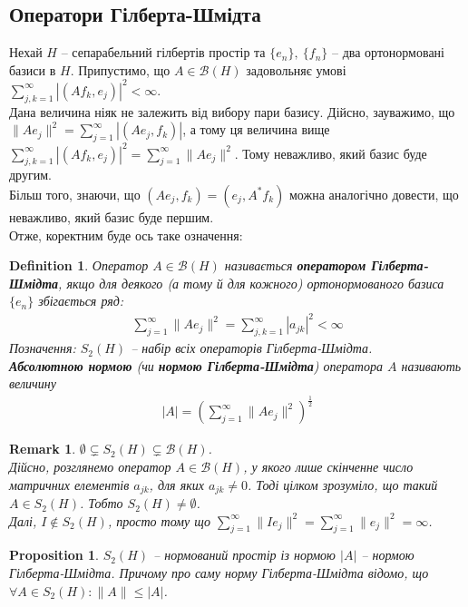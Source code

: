 \documentclass[a4paper, 10pt]{article}
\theoremstyle{theoremdd}
\theoremstyle{theoremdd}
\newtheorem{definition}[theorem]{Definition}
\theoremstyle{theoremdd}
\theoremstyle{theoremdd}
\theoremstyle{theoremdd}
\newtheorem{proposition}[theorem]{Proposition}
\theoremstyle{theoremdd}
\newtheorem{remark}[theorem]{Remark}
\theoremstyle{theoremdd}
\theoremstyle{theoremdd}
\begin{document}
\subsection{Оператори Гілберта-Шмідта}
Нехай $H$ -- сепарабельний гілбертів простір та $\{e_n\},\ \{f_n\}$ -- два ортонормовані базиси в $H$. Припустимо, що $A \in \mathcal{B}(H)$ задовольняє умові $\displaystyle\sum_{j,k=1}^\infty |(Af_k,e_j)|^2 < \infty$.\\
Дана величина ніяк не залежить від вибору пари базису. Дійсно, зауважимо, що $\|Ae_j\|^2 = \displaystyle\sum_{j=1}^\infty |(Ae_j,f_k)|$, а тому ця величина вище $\displaystyle\sum_{j,k=1}^\infty |(Af_k,e_j)|^2 = \sum_{j=1}^\infty \|Ae_j\|^2$. Тому неважливо, який базис буде другим.\\
Більш того, знаючи, що $(Ae_j,f_k) = (e_j,A^*f_k)$ можна аналогічно довести, що неважливо, який базис буде першим.\\
Отже, коректним буде ось таке означення:

\begin{definition}
Оператор $A \in \mathcal{B}(H)$ називається \textbf{оператором Гілберта-Шмідта}, якщо для деякого (а тому й для кожного) ортонормованого базиса $\{e_n\}$ збігається ряд:
\begin{align*}
\displaystyle\sum_{j=1}^\infty \|Ae_j\|^2 = \sum_{j,k=1}^\infty |a_{jk}|^2 < \infty
\end{align*}
Позначення: $S_2(H)$ -- набір всіх операторів Гілберта-Шмідта.\\
\textbf{Абсолютною нормою} (чи \textbf{нормою Гілберта-Шмідта}) оператора $A$ називають величину
\begin{align*}
|A| = \left(\sum_{j=1}^\infty \|Ae_j\|^2 \right)^{\frac{1}{2}}
\end{align*}
\end{definition}

\begin{remark}
$\emptyset \subsetneq S_2(H) \subsetneq \mathcal{B}(H)$.\\
Дійсно, розглянемо оператор $A \in \mathcal{B}(H)$, у якого лише скінченне число матричних елементів $a_{jk}$, для яких $a_{jk} \neq 0$. Тоді цілком зрозуміло, що такий $A \in S_2(H)$. Тобто $S_2(H) \neq \emptyset$.\\
Далі, $I \notin S_2(H)$, просто тому що $\displaystyle\sum_{j=1}^\infty \|Ie_j\|^2 = \sum_{j=1}^\infty \|e_j\|^2 = \infty$.
\end{remark}

\begin{proposition}
$S_2(H)$ -- нормований простір із нормою $|A|$ -- нормою Гілберта-Шмідта. Причому про саму норму Гілберта-Шмідта відомо, що $\forall A \in S_2(H): \|A\| \leq |A|$.
\end{proposition}
\end{document}
